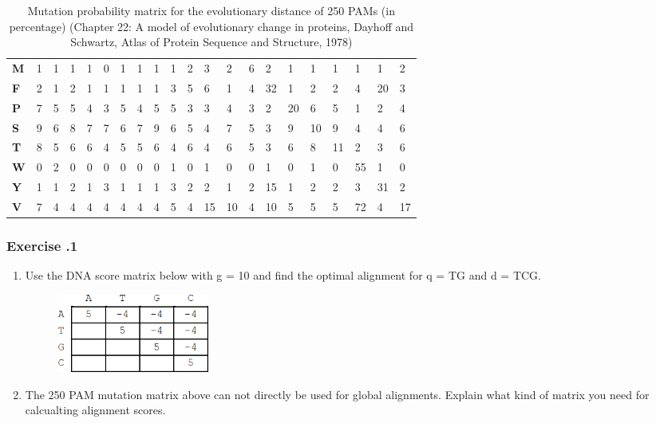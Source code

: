 \begin{table}[!ht]
\begin{tabular}{lllllllllllllllllllll}
\textbf{M} & 1   & 1   & 1   & 1   & 0   & 1   & 1   & 1   & 1   & 2   & 3   & 2   & 6   & 2   & 1   & 1   & 1   & 1   & 1   & 2   \\
\textbf{F} & 2   & 1   & 2   & 1   & 1   & 1   & 1   & 1   & 3   & 5   & 6   & 1   & 4   & 32  & 1   & 2   & 2   & 4   & 20  & 3   \\
\textbf{P} & 7   & 5   & 5   & 4   & 3   & 5   & 4   & 5   & 5   & 3   & 3   & 4   & 3   & 2   & 20  & 6   & 5   & 1   & 2   & 4   \\
\textbf{S} & 9   & 6   & 8   & 7   & 7   & 6   & 7   & 9   & 6   & 5   & 4   & 7   & 5   & 3   & 9   & 10  & 9   & 4   & 4   & 6   \\
\textbf{T} & 8   & 5   & 6   & 6   & 4   & 5   & 5   & 6   & 4   & 6   & 4   & 6   & 5   & 3   & 6   & 8   & 11  & 2   & 3   & 6   \\
\textbf{W} & 0   & 2   & 0   & 0   & 0   & 0   & 0   & 0   & 1   & 0   & 1   & 0   & 0   & 1   & 0   & 1   & 0   & 55  & 1   & 0   \\
\textbf{Y} & 1   & 1   & 2   & 1   & 3   & 1   & 1   & 1   & 3   & 2   & 2   & 1   & 2   & 15  & 1   & 2   & 2   & 3   & 31  & 2   \\
\textbf{V} & 7   & 4   & 4   & 4   & 4   & 4   & 4   & 4   & 5   & 4   & 15  & 10  & 4   & 10  & 5   & 5   & 5   & 72  & 4   & 17 
\end{tabular}
\caption{Mutation probability matrix for the evolutionary distance of 250 PAMs (in percentage) (Chapter 22: A model of evolutionary change in proteins, Dayhoff and Schwartz, Atlas of Protein Sequence and Structure, 1978)}
\end{table}

%
%
\subsubsection*{Exercise \thesection.1}
\begin{enumerate}
\item Use the DNA score matrix below with g = 10 and find the optimal alignment for q = TG and d = TCG.

\begin{figure}[H]
  \centering
      \includegraphics[width=0.25\textwidth]{fig03/dna_matrix_exercise.png}
\end{figure}

\item The 250 PAM mutation matrix above can not directly be used for global alignments. Explain what kind of matrix you need for calcualting alignment scores.
\end{enumerate}

%

